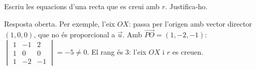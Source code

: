 \begin{apartats}
\begin{nomesllarg}
Escriu les equacions d'una recta que es creui amb $r$. Justifica-ho.

\begin{solucio}
Resposta oberta. Per exemple, l'eix $OX$: passa per l'origen amb vector director $(1,0,0)$, que no és
proporcional a $\vec u$. Amb $\overrightarrow{PO}=(1,-2,-1)$:
$\begin{vmatrix}1&-1&2\\1&0&0\\1&-2&-1\end{vmatrix}=-5\ne0$. El rang és 3: l'eix $OX$ i $r$ es creuen.
\end{solucio}
\end{nomesllarg}

\end{apartats}
